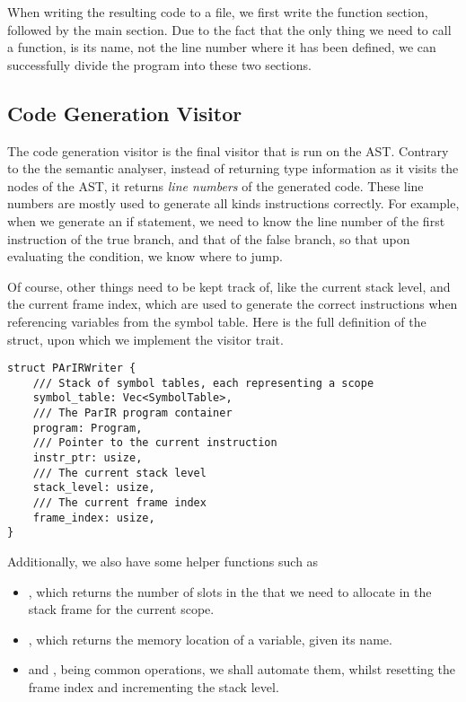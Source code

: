 When writing the resulting  code to a file, we first write the
function section, followed by the main section. Due to the fact that the only
thing we need to call a function, is its name, not the line number where it has
been defined, we can successfully divide the program into these two sections.

\newpage

\subsection{Code Generation Visitor}

The code generation visitor is the final visitor that is run on the AST.
Contrary to the the semantic analyser, instead of returning type information as
it visits the nodes of the AST, it returns \textit{line numbers} of the
generated  code. These line numbers are mostly used to generate all
kinds  instructions correctly. For example, when we generate an if
statement, we need to know the line number of the first instruction of the true
branch, and that of the false branch, so that upon evaluating the condition, we
know where to jump.

Of course, other things need to be kept track of, like the current stack level,
and the current frame index, which are used to generate the correct 
instructions when referencing variables from the symbol table. Here is the full
definition of the  struct, upon which we implement the visitor
trait.

\begin{mainbox}{}
    \lstset{xleftmargin=.1\textwidth, aboveskip=0pt, belowskip=0pt}
    \begin{lstlisting}
struct PArIRWriter {
    /// Stack of symbol tables, each representing a scope
    symbol_table: Vec<SymbolTable>,
    /// The ParIR program container
    program: Program,
    /// Pointer to the current instruction
    instr_ptr: usize,
    /// The current stack level
    stack_level: usize,
    /// The current frame index
    frame_index: usize,
}
\end{lstlisting}
\end{mainbox}

Additionally, we also have some helper functions such as

\begin{itemize}
    \item {}, which returns the number of slots in
          the that we need to allocate in the stack frame for the current scope.
    \item {}, which returns the memory
          location of a variable, given its name.  \item {} and
          , being common operations, we shall automate them, whilst
          resetting the frame index and incrementing the stack level.
\end{itemize}
